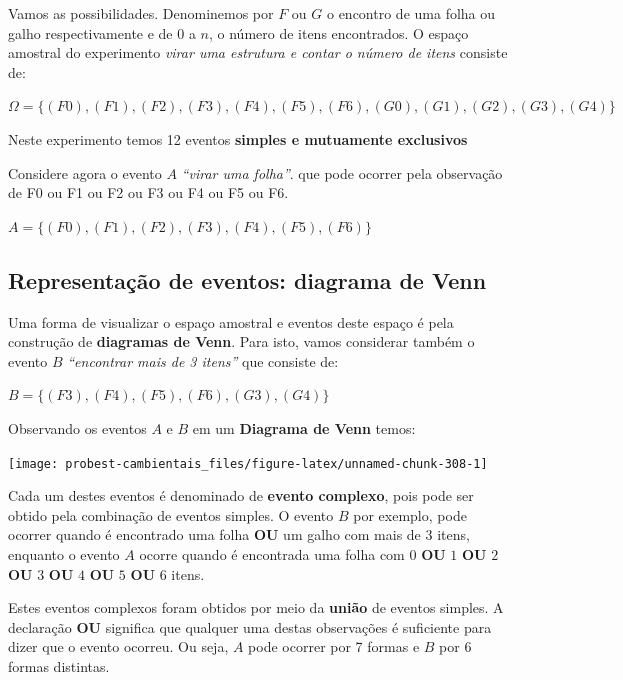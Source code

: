 \documentclass[
]{book}
\begin{document}
Vamos as possibilidades. Denominemos por \(F\) ou \(G\) o encontro de uma folha ou galho respectivamente e de \(0\) a \(n\), o número de itens encontrados. O espaço amostral do experimento \emph{virar uma estrutura e contar o número de itens} consiste de:

\(\Omega = \{(F0), (F1), (F2), (F3), (F4), (F5), (F6), (G0), (G1), (G2), (G3), (G4)\}\)

Neste experimento temos 12 eventos \textbf{simples e mutuamente exclusivos}

Considere agora o evento \(A\) \emph{``virar uma folha''}. que pode ocorrer pela observação de F0 ou F1 ou F2 ou F3 ou F4 ou F5 ou F6.

\(A = \{(F0), (F1), (F2), (F3), (F4), (F5), (F6)\}\)

\hypertarget{representauxe7uxe3o-de-eventos-diagrama-de-venn}{%
\subsection{Representação de eventos: diagrama de Venn}\label{representauxe7uxe3o-de-eventos-diagrama-de-venn}}

Uma forma de visualizar o espaço amostral e eventos deste espaço é pela construção de \textbf{diagramas de Venn}. Para isto, vamos considerar também o evento \(B\) \emph{``encontrar mais de 3 itens''} que consiste de:

\(B = \{(F3), (F4), (F5), (F6), (G3), (G4)\}\)

Observando os eventos \(A\) e \(B\) em um \textbf{Diagrama de Venn} temos:

\begin{center}\texttt{[image: probest-cambientais\_files/figure-latex/unnamed-chunk-308-1]} \end{center}

Cada um destes eventos é denominado de \textbf{evento complexo}, pois pode ser obtido pela combinação de eventos simples. O evento \(B\) por exemplo, pode ocorrer quando é encontrado uma folha \textbf{OU} um galho com mais de 3 itens, enquanto o evento \(A\) ocorre quando é encontrada uma folha com \(0\) \textbf{OU} \(1\) \textbf{OU} \(2\) \textbf{OU} \(3\) \textbf{OU} \(4\) \textbf{OU} \(5\) \textbf{OU} \(6\) itens.

Estes eventos complexos foram obtidos por meio da \textbf{união} de eventos simples. A declaração \textbf{OU} significa que qualquer uma destas observações é suficiente para dizer que o evento ocorreu. Ou seja, \(A\) pode ocorrer por 7 formas e \(B\) por 6 formas distintas.
\end{document}
